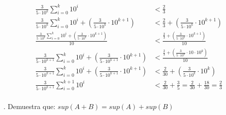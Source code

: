 \documentclass{article}
\begin{document}
\begin{align*}
    \frac{3}{5 \cdot 10^k}\sum\limits_{i=0}^k 10^i &< \frac{2}{3} \\
    \frac{3}{5 \cdot 10^k}\sum\limits_{i=0}^k 10^i + \left( \frac{3}{5 \cdot 10^k} \cdot 10^{k+1} \right) &< \frac{2}{3} + \left( \frac{3}{5 \cdot 10^k} \cdot 10^{k+1} \right) \\
    \frac{\frac{3}{5 \cdot 10^k}\sum\limits_{i=0}^k 10^i + \left( \frac{3}{5 \cdot 10^k} \cdot 10^{k+1} \right)}{10} &< \frac{\frac{2}{3} + \left( \frac{3}{5 \cdot 10^k} \cdot 10^{k+1} \right)}{10} \\
    \frac{3}{5 \cdot 10^{k+1}}\sum\limits_{i=0}^k 10^i + \left( \frac{3}{5 \cdot 10^{k+1}} \cdot 10^{k+1} \right) &< \frac{\frac{2}{3} + \left( \frac{3}{5 \cdot 10^k} \cdot 10 \cdot 10^{k} \right)}{10} \\
    \frac{3}{5 \cdot 10^{k+1}}\sum\limits_{i=0}^k 10^i + \left( \frac{3}{5 \cdot 10^{k+1}} \cdot 10^{k+1} \right) &< \frac{2}{30} + \left( \frac{3}{5 \cdot 10^k} \cdot 10^{k} \right) \\
    \frac{3}{5 \cdot 10^{k+1}}\sum\limits_{i=0}^{k+1} 10^i &< \frac{2}{30} + \frac{3}{5} = \frac{2}{30} + \frac{18}{30} = \frac{2}{3}\\
\end{align*}


  . Demuestra que: \(sup(A+B)=sup(A)+sup(B)\) \\
\end{document}
